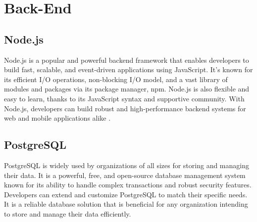\section{Back-End}

\subsection{Node.js}
Node.js is a popular and powerful backend framework that enables developers to build fast, scalable, and event-driven applications using JavaScript. It’s known for its efficient I/O operations, non-blocking I/O model, and a vast library of modules and packages via its package manager, npm. Node.js is also flexible and easy to learn, thanks to its JavaScript syntax and supportive community. With Node.js, developers can build robust and high-performance backend systems for web and mobile applications alike \cite{casciaro2020nodejs}.

\subsection{PostgreSQL}
PostgreSQL is widely used by organizations of all sizes for storing and managing their data. It is a powerful, free, and open-source database management system known for its ability to handle complex transactions and robust security features. Developers can extend and customize PostgreSQL to match their specific needs. It is a reliable database solution that is beneficial for any organization intending to store and manage their data efficiently.